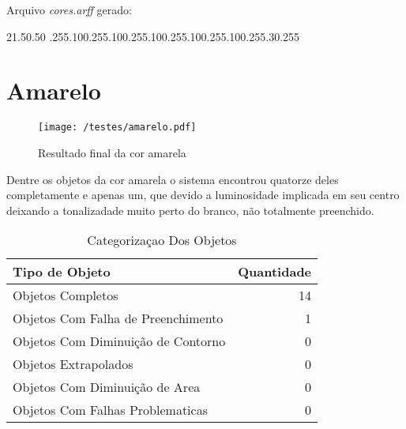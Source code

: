 	
Arquivo \textit{cores.arff} gerado:
\begin{center}
21.50.50 .255.100.255.100.255.100.255.100.255.100.255.30.255\newline
\end{center}







 



\section{Amarelo}
	\begin{figure}[H]
		\centering
		\texttt{[image: /testes/amarelo.pdf]}
		\caption{Resultado final da cor amarela}
		\label{disposicaoparte}
	\end{figure}
	
	Dentre os objetos da cor amarela o sistema encontrou quatorze deles completamente e apenas um, que devido a luminosidade implicada em seu centro deixando a tonalizadade muito perto do branco, não totalmente preenchido.
	
	\begin{table}[h]
\centering
\begin{tabular}{l|r}
Tipo de Objeto & Quantidade \\ %
\hline                               %
Objetos Completos & 14 \\
\hline 
Objetos Com Falha de Preenchimento & 1 \\
\hline 
Objetos Com Diminuição de Contorno & 0 \\
\hline 
Objetos Extrapolados & 0 \\
\hline 
Objetos Com Diminuição de Area &  0\\
\hline 
Objetos Com Falhas Problematicas & 0\\
\hline 
\end{tabular}
\caption{Categorizaçao Dos Objetos}
\end{table}


